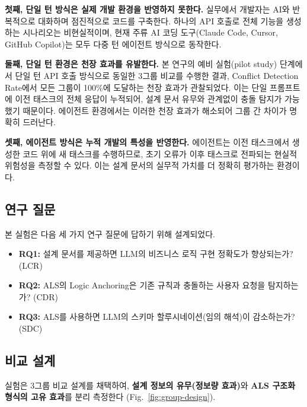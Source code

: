 \documentclass[conference]{IEEEtran}
\begin{document}
\textbf{첫째, 단일 턴 방식은 실제 개발 환경을 반영하지 못한다.} 실무에서 개발자는 AI와 반복적으로 대화하며 점진적으로 코드를 구축한다. 하나의 API 호출로 전체 기능을 생성하는 시나리오는 비현실적이며, 현재 주류 AI 코딩 도구(Claude Code, Cursor, GitHub Copilot)는 모두 다중 턴 에이전트 방식으로 동작한다.

\textbf{둘째, 단일 턴 환경은 천장 효과를 유발한다.} 본 연구의 예비 실험(pilot study) 단계에서 단일 턴 API 호출 방식으로 동일한 3그룹 비교를 수행한 결과, Conflict Detection Rate에서 모든 그룹이 100\%에 도달하는 천장 효과가 관찰되었다. 이는 단일 프롬프트에 이전 태스크의 전체 응답이 누적되어, 설계 문서 유무와 관계없이 충돌 탐지가 가능했기 때문이다. 에이전트 환경에서는 이러한 천장 효과가 해소되어 그룹 간 차이가 명확히 드러난다.

\textbf{셋째, 에이전트 방식은 누적 개발의 특성을 반영한다.} 에이전트는 이전 태스크에서 생성한 코드 위에 새 태스크를 수행하므로, 초기 오류가 이후 태스크로 전파되는 현실적 위험성을 측정할 수 있다. 이는 설계 문서의 실무적 가치를 더 정확히 평가하는 환경이다.

\subsection{연구 질문}

본 실험은 다음 세 가지 연구 질문에 답하기 위해 설계되었다.

\begin{itemize}
  \item \textbf{RQ1:} 설계 문서를 제공하면 LLM의 비즈니스 로직 구현 정확도가 향상되는가? (LCR)
  \item \textbf{RQ2:} ALS의 Logic Anchoring은 기존 규칙과 충돌하는 사용자 요청을 탐지하는가? (CDR)
  \item \textbf{RQ3:} ALS를 사용하면 LLM의 스키마 할루시네이션(임의 해석)이 감소하는가? (SDC)
\end{itemize}

\subsection{비교 설계}

실험은 3그룹 비교 설계를 채택하여, \textbf{설계 정보의 유무(정보량 효과)}와 \textbf{ALS 구조화 형식의 고유 효과}를 분리 측정한다 (Fig.~\ref{fig:group-design}).
\end{document}
